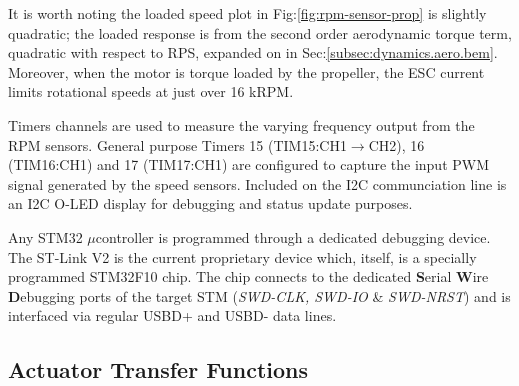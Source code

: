\par
It is worth noting the loaded speed plot in Fig:\ref{fig:rpm-sensor-prop} is slightly quadratic; the loaded response is from the second order aerodynamic torque term, quadratic with respect to RPS, expanded on in Sec:\ref{subsec:dynamics.aero.bem}. Moreover, when the motor is torque loaded by the propeller, the ESC current limits rotational speeds at just over 16 kRPM.
\par
Timers channels are used to measure the varying frequency output from the RPM sensors. General purpose Timers 15 (TIM15:CH1$\rightarrow$CH2), 16 (TIM16:CH1) and 17 (TIM17:CH1) are configured to capture the input PWM signal generated by the speed sensors. Included on the I2C communciation line is an I2C O-LED display for debugging and status update purposes.
\par
Any STM32 $\mu$controller is programmed through a dedicated debugging device. The ST-Link V2\cite{st-link} is the current proprietary device which, itself, is a specially programmed STM32F10 chip. The chip connects to the dedicated \textbf{S}erial \textbf{W}ire \textbf{D}ebugging ports of the target STM (\emph{SWD-CLK, SWD-IO} \& \emph{SWD-NRST}) and is interfaced via regular USBD+ and USBD- data lines. 
\subsection{Actuator Transfer Functions}
\label{subsec:proto.design.transfer}
